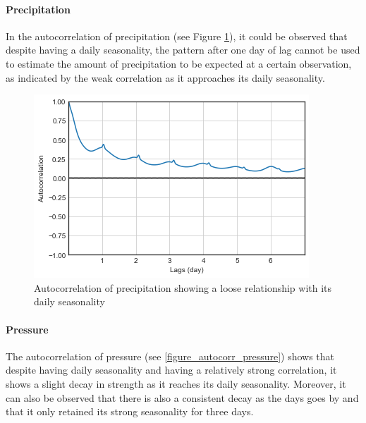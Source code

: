 \paragraph{Precipitation}

In the autocorrelation of precipitation (see Figure \ref{figure_autocorr_precip}), it could be observed that despite having a daily seasonality, the pattern after one day of lag cannot be used to estimate the amount of precipitation to be expected at a certain observation, as indicated by the weak correlation as it approaches its daily seasonality.

\begin{figure}
  \includegraphics[width=\linewidth]
  {figures/figure_autocorr_precip.png}
  \caption{ Autocorrelation of precipitation showing a loose relationship with its daily seasonality}
  \label{figure_autocorr_precip}
\end{figure}

\paragraph{Pressure}

The autocorrelation of pressure (see \ref{figure_autocorr_pressure}) shows that despite having daily seasonality and having a relatively strong correlation, it shows a slight decay in strength as it reaches its daily seasonality. Moreover, it can also be observed that there is also a consistent decay as the days goes by and that it only retained its strong seasonality for three days.



